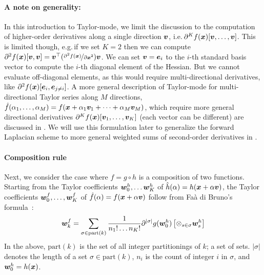\paragraph{A note on generality:} In this introduction to Taylor-mode, we limit the discussion to the computation of higher-order derivatives along a single direction ${\bm{v}}$, i.e.\,$\partial^Kf({\bm{x}})[{\bm{v}}, \dots, {\bm{v}}]$.
This is limited though, e.g.\,if we set $K=2$ then we can compute $\partial^2 f({\bm{x}})[{\bm{v}}, {\bm{v}}] = {\bm{v}}^{\top} (\nicefrac{\partial^2 f({\bm{x}})}{\partial{\bm{x}}^2}) {\bm{v}}$.
We can set ${\bm{v}} = {\bm{e}}_i$ to the $i$-th standard basis vector to compute the $i$-th diagonal element of the Hessian.
But we cannot evaluate off-diagonal elements, as this would require multi-directional derivatives, like $\partial^2 f({\bm{x}}) [{\bm{e}}_i, {\bm{e}}_{j\neq i}]$.
A more general description of Taylor-mode for multi-directional Taylor series along $M$ directions, $\hat{f}(\alpha_1, \dots, \alpha_M) = f({\bm{x}} + \alpha_1 {\bm{v}}_1 + \dots + \alpha_M {\bm{v}}_M)$, which require more general directional derivatives $\partial^K f({\bm{x}}) [{\bm{v}}_1, \dots, {\bm{v}}_K]$ (each vector can be different) are discussed in \cite{johnson2021taylor-made}.
We will use this formulation later to generalize the forward Laplacian scheme to more general weighted sums of second-order derivatives in .

\paragraph{Composition rule}
Next, we consider the case where $f = g \circ h$ is a composition of two functions. Starting from the Taylor coefficients ${\bm{w}}_0^h, \dots {\bm{w}}_K^h$ of $\hat{h}(\alpha) = h({\bm{x}} + \alpha {\bm{v}})$, the Taylor coefficients ${\bm{w}}_0^f, \dots, {\bm{w}}_K^f$ of $\hat{f}(\alpha) = f({\bm{x}} + \alpha{\bm{v}})$ follow from Fa\`a di Bruno's formula~\cite{griewank2008evaluating,bettencourt2019taylor}:
\begin{align}\label{eq:taylor-mode-forward}
  {\bm{w}}_{k}^f
  =
  \sum_{\sigma \in \mathrm{part}(k)}
  \frac{1}{n_1! \dots n_K!}
  \partial^{|\sigma|}g({\bm{w}}_0^h)
  \left[
  \otimes_{s \in \sigma}
  {\bm{w}}_s^h
  \right]
\end{align}
In the above, $\mathrm{part}(k)$ is the set of all integer partitionings of $k$; a set of sets. $|\sigma|$ denotes the length of a set $\sigma \in \mathrm{part}(k)$, $n_i$ is the count of integer $i$ in $\sigma$, and ${\bm{w}}_0^h = h({\bm{x}})$.

